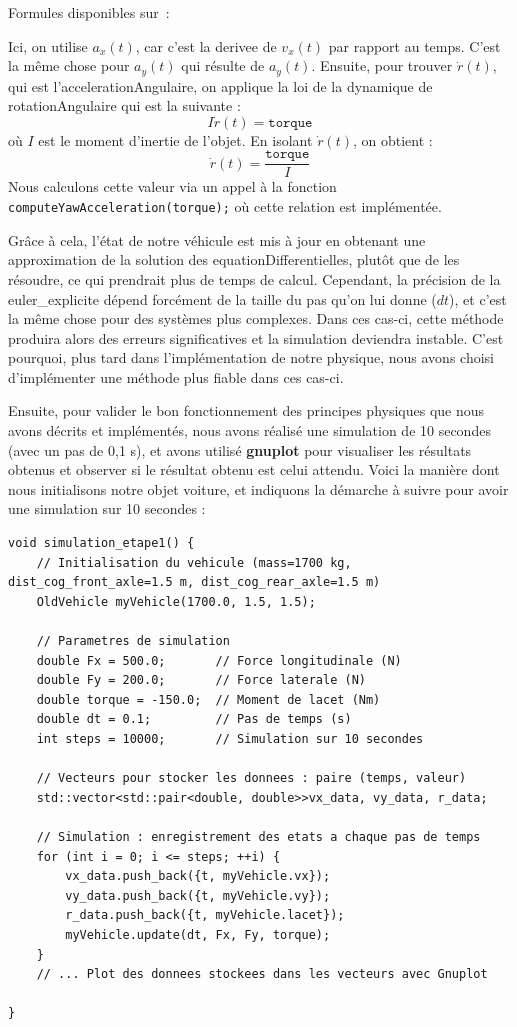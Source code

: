 \begin{center}
    Formules disponibles sur~\cite{euler_explicite}:
\end{center}

Ici, on utilise $a_x(t)$, car c'est la \gls{derivee} de $v_x(t)$ par rapport au temps.
C'est la même chose pour $a_y(t)$ qui résulte de $a_y(t)$.
Ensuite, pour trouver $\dot{r}(t)$, qui est l'\gls{accelerationAngulaire}, on applique la loi de la dynamique de \gls{rotationAngulaire} qui est la suivante :
$$I\dot{r}(t) = \texttt{torque}$$
où $I$ est le moment d'inertie de l'objet.
En isolant $\dot{r}(t)$, on obtient :
$$\dot{r}(t)= \frac{\texttt{torque}}{I}$$
Nous calculons cette valeur via un appel à la fonction \texttt{computeYawAcceleration(torque);} où cette relation est implémentée.

Grâce à cela, l'état de notre véhicule est mis à jour en obtenant une approximation de la solution des \glspl{equationDifferentielle}, plutôt que de les résoudre, ce qui prendrait plus de temps de calcul.
Cependant, la précision de la \gls{euler_explicite} dépend forcément de la taille du pas qu'on lui donne ($dt$), et c'est la même chose pour des systèmes plus complexes.
Dans ces cas-ci, cette méthode produira alors des erreurs significatives et la simulation deviendra instable.
C'est pourquoi, plus tard dans l'implémentation de notre physique, nous avons choisi d'implémenter une méthode plus fiable dans ces cas-ci.

Ensuite, pour valider le bon fonctionnement des principes physiques que nous avons décrits et implémentés, nous avons réalisé une simulation de 10 secondes (avec un pas de 0,1 s), et avons utilisé \textbf{\gls{gnuplot}} pour visualiser les résultats obtenus et observer si le résultat obtenu est celui attendu.
Voici la manière dont nous initialisons notre objet voiture, et indiquons la démarche à suivre pour avoir une simulation sur 10 secondes :

\begin{lstlisting}[style=CStyle,label={lst:void_simulation_etape1}]
void simulation_etape1() {
    // Initialisation du vehicule (mass=1700 kg, dist_cog_front_axle=1.5 m, dist_cog_rear_axle=1.5 m)
    OldVehicle myVehicle(1700.0, 1.5, 1.5);

    // Parametres de simulation
    double Fx = 500.0;       // Force longitudinale (N)
    double Fy = 200.0;       // Force laterale (N)
    double torque = -150.0;  // Moment de lacet (Nm)
    double dt = 0.1;         // Pas de temps (s)
    int steps = 10000;       // Simulation sur 10 secondes

    // Vecteurs pour stocker les donnees : paire (temps, valeur)
    std::vector<std::pair<double, double>>vx_data, vy_data, r_data;

    // Simulation : enregistrement des etats a chaque pas de temps
    for (int i = 0; i <= steps; ++i) {
        vx_data.push_back({t, myVehicle.vx});
        vy_data.push_back({t, myVehicle.vy});
        r_data.push_back({t, myVehicle.lacet});
        myVehicle.update(dt, Fx, Fy, torque);
    }
    // ... Plot des donnees stockees dans les vecteurs avec Gnuplot

}
\end{lstlisting}

